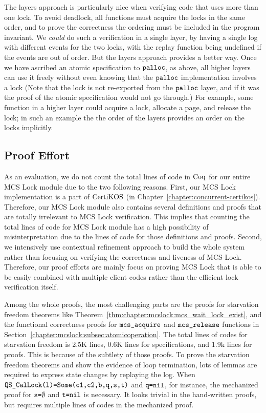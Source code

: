 The layers approach is particularly nice when verifying code that uses more than one
lock. To avoid deadlock, all functions must acquire the locks in the
same order, and to prove the correctness the ordering must be
included in the program invariant. We \emph{could} do such a
verification in a single layer, by having a single log with different
events for the two locks, with the replay function being undefined if
the events are out of order. But the layers approach provides a
better way. Once we have ascribed an atomic specification to
${\mathrm{\texttt{palloc}}}$, as above, all higher layers can use it
freely without even knowing that the ${\mathrm{\texttt{palloc}}}$ implementation
involves a lock (Note that the lock is not re-exported from the
${\mathrm{\texttt{palloc}}}$ layer, and if it was the proof of the atomic
specification would not go through.)  For example, some function in a
higher layer could acquire a lock, allocate a page, and release the
lock; in such an example the the order of the layers provides an order
on the locks implicitly.

\subsection{Proof Effort}


As an evaluation, we do not count the total lines of code in $\mathrm{Coq}$ for our entire 
MCS Lock module due to the two following reasons. First, our MCS Lock implementation 
is a part of $\mathrm{CertiKOS}$ (in Chapter~\ref{chapter:concurrent-certikos}). Therefore, our MCS Lock module also contains several definitions 
and proofs that are totally irrelevant to MCS Lock verification. 
This implies that counting the total lines of code for MCS Lock module has a 
high possibility of misinterpretation due to the lines of code for those definitions and proofs.
Second, we intensively use contextual refinement approach to 
build the whole system rather than focusing on verifying the correctness and 
liveness of MCS Lock. Therefore, our proof efforts are mainly focus on proving 
MCS Lock that is able to be easily combined with multiple client codes 
rather than the efficient lock verification itself.  

Among the whole proofs, the most challenging parts are the proofs for starvation 
freedom theorems like Theorem~\ref{thm:chapter:mcslock:mcs_wait_lock_exist}, 
and the functional correctness proofs for ${\mathrm{\texttt{mcs\_acquire}}}$ 
and ${\mathrm{\texttt{mcs\_release}}}$ functions
in Section~\ref{chapter:mcslock:subsec:atomicoperation}.
The total lines of codes for starvation freedom is 2.5K lines, 0.6K lines for specifications, 
and 1.9k lines for proofs. This is because of the subtlety of those proofs. 
To prove the starvation freedom theorems and show the evidence of loop termination,
lots of lemmas are required to express
state changes by replaying the log. 
When ${\mathrm{\texttt{QS\_CalLock}}}{\mathrm{\texttt{(l)=}}}{\mathrm{\texttt{Some}}}{\mathrm{\texttt{(c1,c2,b,q,s,t)}}}$
and ${\mathrm{\texttt{q=}}}{\mathrm{\texttt{nil}}}$, 
for instance, the mechanized proof for ${\mathrm{\texttt{s=}}}\emptyset$ 
and ${\mathrm{\texttt{t=}}}{\mathrm{\texttt{nil}}}$ is necessary. It looks trivial in the hand-written proofs, 
but requires multiple lines of codes in the mechanized proof. 

